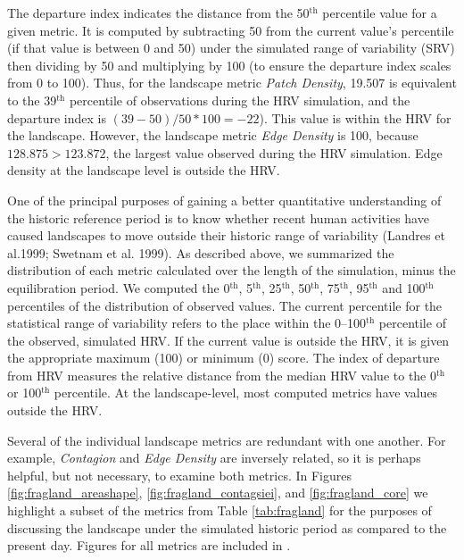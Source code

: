 The departure index indicates the distance from the 50$^{\text{th}}$ percentile value for a given metric. It is computed by subtracting 50 from the current value's percentile (if that value is between 0 and 50) under the simulated range of variability (SRV) then dividing by 50 and multiplying by 100 (to ensure the departure index scales from 0 to 100). Thus, for the landscape metric \emph{Patch Density}, 19.507 is equivalent to the 39$^{\text{th}}$ percentile of observations during the HRV simulation, and the departure index is $(39-50)/50*100 = -22$). This value is within the HRV for the landscape. However, the landscape metric \emph{Edge Density} is 100, because $128.875 > 123.872$, the largest value observed during the HRV simulation. Edge density at the landscape level is outside the HRV.

One of the principal purposes of gaining a better quantitative understanding of the historic reference period is to know whether recent human activities have caused landscapes to move outside their historic range of variability (Landres et al.1999; Swetnam et al. 1999). As described above, we summarized the distribution of each metric calculated over the length of the simulation, minus the equilibration period. We computed the 0$^{\text{th}}$, 5$^{\text{th}}$, 25$^{\text{th}}$, 50$^{\text{th}}$, 75$^{\text{th}}$, 95$^{\text{th}}$ and 100$^{\text{th}}$ percentiles of the distribution of observed values. The current percentile for the statistical range of variability refers to the place within the 0--100$^{\text{th}}$ percentile of the observed, simulated HRV. If the current value is outside the HRV, it is given the appropriate maximum (100) or minimum (0) score. The index of departure from HRV measures the relative distance from the median HRV value to the 0$^{\text{th}}$ or 100$^{\text{th}}$ percentile. At the landscape-level, most computed metrics have values outside the HRV. 

Several of the individual landscape metrics are redundant with one another. For example, \emph{Contagion} and \emph{Edge Density} are inversely related, so it is perhaps helpful, but not necessary, to examine both metrics. In Figures \ref{fig:fragland_areashape}, \ref{fig:fragland_contagsiei}, and \ref{fig:fragland_core} we highlight a subset of the metrics from Table \ref{tab:fragland} for the purposes of discussing the landscape under the simulated historic period as compared to the present day. Figures for all metrics are included in .


